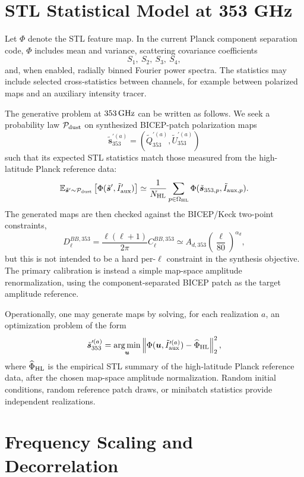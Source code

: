 \documentclass[11pt]{article}
\begin{document}
\section{STL Statistical Model at 353 GHz}

Let $\Phi$ denote the STL feature map.  In the current Planck component
separation code, $\Phi$ includes mean and variance, scattering covariance
coefficients
\[
  S_1,\ S_2,\ S_3,\ S_4,
\]
and, when enabled, radially binned Fourier power spectra.  The statistics may
include selected cross-statistics between channels, for example between
polarized maps and an auxiliary intensity tracer.

The generative problem at $353\,{\rm GHz}$ can be written as follows.  We seek
a probability law $\mathcal P_{\rm dust}$ on synthesized BICEP-patch
polarization maps
\[
  \tilde{\bm s}_{353}^{\prime(a)}
  =
  \left(\tilde Q_{353}^{\prime(a)},\tilde U_{353}^{\prime(a)}\right)
\]
such that its expected STL statistics match those measured from the
high-latitude Planck reference data:
\[
  \mathbb E_{\tilde{\bm s}'\sim\mathcal P_{\rm dust}}
  \left[\Phi(\tilde{\bm s}', \tilde I_{\rm aux}')\right]
  \simeq
  \frac{1}{N_{\rm HL}}
  \sum_{p\in\Omega_{\rm HL}}
  \Phi(\tilde{\bm s}_{353,p}, \tilde I_{{\rm aux},p}).
\]
The generated maps are then checked against the BICEP/Keck two-point
constraints,
\[
  D_\ell^{BB,353}
  =
  \frac{\ell(\ell+1)}{2\pi} C_\ell^{BB,353}
  \simeq
  A_{d,353}
  \left(\frac{\ell}{80}\right)^{\alpha_d},
\]
but this is not intended to be a hard per-$\ell$ constraint in the synthesis
objective.  The primary calibration is instead a simple map-space amplitude
renormalization, using the component-separated BICEP patch as the target
amplitude reference.

Operationally, one may generate maps by solving, for each realization $a$, an
optimization problem of the form
\[
  \tilde{\bm s}_{353}^{\prime(a)}
  =
  \operatorname*{arg\,min}_{\bm u}
  \left\|
    \Phi(\bm u,\tilde I_{\rm aux}^{\prime(a)})
    -
    \widehat{\Phi}_{\rm HL}
  \right\|_2^2,
\]
where $\widehat{\Phi}_{\rm HL}$ is the empirical STL summary of the
high-latitude Planck reference data, after the chosen map-space amplitude
normalization.  Random initial conditions, random reference patch draws, or
minibatch statistics provide independent realizations.

\section{Frequency Scaling and Decorrelation}
\end{document}
